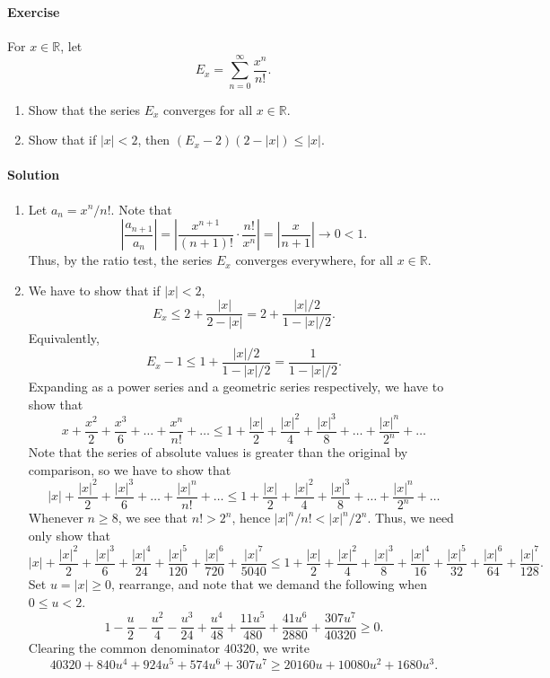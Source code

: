 \documentclass[10pt]{article}
\newcounter{prob}
\def\problem{\stepcounter{prob}\paragraph{Exercise \arabic{prob}}}
\def\solution{\paragraph{Solution}}
\begin{document}
        \problem For $x \in \mathbb{R}$, let
        \[
                E_x = \sum_{n = 0}^\infty \frac{x^n}{n!}.
        \]
        \begin{enumerate}
                \item Show that the series $E_x$ converges for all $x \in \mathbb{R}$.
                \item Show that if $|x| < 2$, then $(E_x - 2)(2 - |x|) \leq |x|$.
        \end{enumerate}
        \solution
        \begin{enumerate}
                \item Let $a_n = x^n /n!$. Note that
                \[
                        \left| \frac{a_{n + 1}}{a_n} \right| = \left| \frac{x^{n + 1}}{(n + 1)!}\cdot \frac{n!}{x^n} \right| = 
                        \left|\frac{x}{n + 1}\right| \to 0 < 1.
                \]
                Thus, by the ratio test, the series $E_x$ converges everywhere, for all $x \in \mathbb{R}$.

                \item We have to show that if $|x| < 2$,
                \[
                        E_x \leq 2 + \frac{|x|}{2 - |x|} = 2 + \frac{|x| /2}{1 - |x|/2}.
                \]
                Equivalently,
                \[
                        E_x - 1 \leq 1 + \frac{|x|/2}{1 - |x|/2} = \frac{1}{1 - |x| /2}.
                \]
                Expanding as a power series and a geometric series respectively, we have to show that
                \[
                        x + \frac{x^2}{2} + \frac{x^3}{6} + \dots + \frac{x^n}{n!} + \dots \leq 
                        1 + \frac{|x|}{2} + \frac{|x|^2}{4} + \frac{|x|^3}{8} + \dots + \frac{|x|^n}{2^n} + \dots
                \]
                Note that the series of absolute values is greater than the original by comparison, so we have to show that
                \[
                        |x| + \frac{|x|^2}{2} + \frac{|x|^3}{6} + \dots + \frac{|x|^n}{n!} + \dots \leq
                        1 + \frac{|x|}{2} + \frac{|x|^2}{4} + \frac{|x|^3}{8} + \dots + \frac{|x|^n}{2^n} + \dots
                \]
                Whenever $n \geq 8$, we see that $n! > 2^n$, hence $|x|^n / n! < |x|^n / 2^n$. Thus, we need only show that
                \[
                        |x| + \frac{|x|^2}{2} + \frac{|x|^3}{6} + \frac{|x|^4}{24} + \frac{|x|^5}{120} + \frac{|x|^6}{720} + \frac{|x|^7}{5040} \leq
                        1 + \frac{|x|}{2} + \frac{|x|^2}{4} + \frac{|x|^3}{8} + \frac{|x|^4}{16} + \frac{|x|^5}{32} + \frac{|x|^6}{64} + \frac{|x|^7}{128}.
                \]
                Set $u = |x| \geq 0$, rearrange, and note that we demand the following when $0 \leq u < 2$.
                \[
                        1 - \frac{u}{2} - \frac{u^2}{4} - \frac{u^3}{24} + \frac{u^4}{48} + \frac{11u^5}{480} + \frac{41u^6}{2880} + \frac{307u^7}{40320}
                                \geq 0.
                \]
                Clearing the common denominator $40320$, we write
                \[
                        40320 + 840 u^4 + 924 u^5 + 574 u^6 + 307 u^7 \geq 20160 u + 10080 u^2 + 1680 u^3.
                \]


\end{enumerate}
\end{document}
